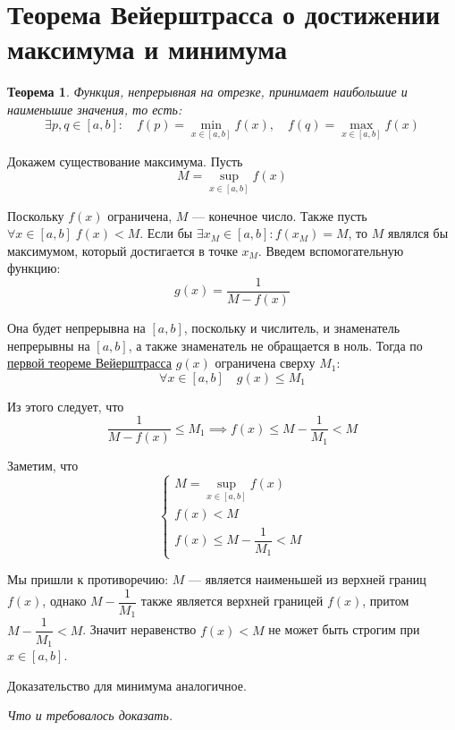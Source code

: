 \documentclass[a4paper,12pt,oneside]{extbook}
\newcommand{\newpar}{$ $\par\nobreak\ignorespaces}
\theoremstyle{numbered}
\theoremstyle{unnumbered}
\newtheorem*{theorem*}{Теорема}
\theoremstyle{named}
\theoremstyle{unnumbered}
\theoremstyle{named}
\theoremstyle{named}
\theoremstyle{named}
\renewenvironment{proof}[1][]{\breakenv[Доказательство]{\if\relax\detokenize{#1}\relax\else\;\fi}{\textbf{#1}}}{\smallskip\newpar \hfill\textit{Что и требовалось доказать.}}
\newcommand{\plink}[2]{\hyperref[#1]{\color{blue}\underline{#2}}}
\begin{document}
\section{Теорема Вейерштрасса о достижении максимума и минимума}%
\label{sec:Теорема Вейерштрасса о достижении максимума и минимума}

\begin{theorem*}
    Функция, непрерывная на отрезке, принимает наибольшие и наименьшие значения, то есть:
    \[
        \exists p, q \in [a, b]: \quad f(p) = \underset{x \in [a, b]}{\min} f(x), \quad f(q) = \underset{x \in [a, b]}{\max} f(x)
    \]
\end{theorem*}

\begin{proof}
    Докажем существование максимума. Пусть
    \[
        M = \underset{x \in [a, b]}{\sup} f(x)
    \]

    Поскольку \(f(x)\) ограничена, \(M\) — конечное число. Также пусть \(\forall x \in [a, b] \; f(x) < M\). Если бы \(\exists x_M \in [a, b]: f(x_M) = M\), то \(M\) являлся бы максимумом, который достигается в точке \(x_M\). Введем вспомогательную функцию:
    \[
        g(x) = \frac{1}{M - f(x)}
    \]

    Она будет непрерывна на \([a, b]\), поскольку и числитель, и знаменатель непрерывны на \([a, b]\), а также знаменатель не обращается в ноль. Тогда по \plink{sec:Теорема Вейерштрасса об ограниченности непрерывной на отрезке функции}{первой теореме Вейерштрасса} \(g(x)\) ограничена сверху \(M_1\):
    \[
        \forall x \in [a, b] \quad g(x) \leq M_1
    \]

    Из этого следует, что
    \[
        \frac{1}{M - f(x)} \leq M_1 \implies f(x) \leq M - \frac{1}{M_1} < M
    \]

    Заметим, что
    \[
        \begin{cases}
            M = \underset{x \in [a, b]}{\sup} f(x) \\
            f(x) < M                               \\
            f(x) \leq M - \dfrac{1}{M_1} < M
        \end{cases}
    \]

    Мы пришли к противоречию: \(M\) — является наименьшей из верхней границ \(f(x)\), однако \(M - \dfrac{1}{M_1}\) также является верхней границей \(f(x)\), притом \(M - \dfrac{1}{M_1} < M\). Значит неравенство \(f(x) < M\) не может быть строгим при \(x \in [a, b]\).

    Доказательство для минимума аналогичное.
\end{proof}
\end{document}
